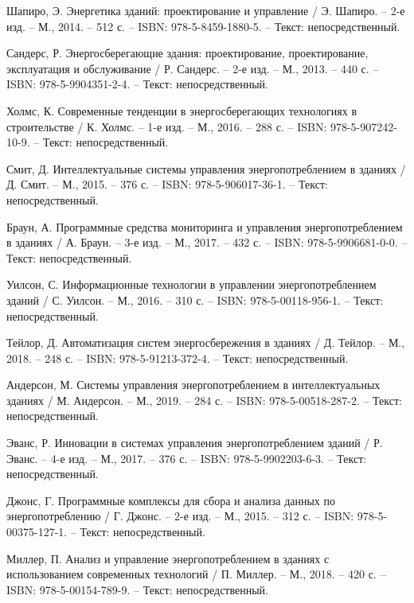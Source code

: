 
\begin{thebibliography}{50}
	
	 Шапиро, Э. Энергетика зданий: проектирование и управление / Э. Шапиро. – 2-е изд. – М., 2014. – 512 с. – ISBN: 978-5-8459-1880-5. – Текст: непосредственный.
	
	 Сандерс, Р. Энергосберегающие здания: проектирование, проектирование, эксплуатация и обслуживание / Р. Сандерс. – 2-е изд. – М., 2013. – 440 с. – ISBN: 978-5-9904351-2-4. – Текст: непосредственный.
	
	 Холмс, К. Современные тенденции в энергосберегающих технологиях в строительстве / К. Холмс. – 1-е изд. – М., 2016. – 288 с. – ISBN: 978-5-907242-10-9. – Текст: непосредственный.
	
	 Смит, Д. Интеллектуальные системы управления энергопотреблением в зданиях / Д. Смит. – М., 2015. – 376 с. – ISBN: 978-5-906017-36-1. – Текст: непосредственный.
	
	 Браун, А. Программные средства мониторинга и управления энергопотреблением в зданиях / А. Браун. – 3-е изд. – М., 2017. – 432 с. – ISBN: 978-5-9906681-0-0. – Текст: непосредственный.
	
	 Уилсон, С. Информационные технологии в управлении энергопотреблением зданий / С. Уилсон. – М., 2016. – 310 с. – ISBN: 978-5-00118-956-1. – Текст: непосредственный.
	
	 Тейлор, Д. Автоматизация систем энергосбережения в зданиях / Д. Тейлор. – М., 2018. – 248 с. – ISBN: 978-5-91213-372-4. – Текст: непосредственный.
	
	 Андерсон, М. Системы управления энергопотреблением в интеллектуальных зданиях / М. Андерсон. – М., 2019. – 284 с. – ISBN: 978-5-00518-287-2. – Текст: непосредственный.
	
	 Эванс, Р. Инновации в системах управления энергопотреблением зданий / Р. Эванс. – 4-е изд. – М., 2017. – 376 с. – ISBN: 978-5-9902203-6-3. – Текст: непосредственный.
	
	 Джонс, Г. Программные комплексы для сбора и анализа данных по энергопотреблению / Г. Джонс. – 2-е изд. – М., 2015. – 312 с. – ISBN: 978-5-00375-127-1. – Текст: непосредственный.
	
	 Миллер, П. Анализ и управление энергопотреблением в зданиях с использованием современных технологий / П. Миллер. – М., 2018. – 420 с. – ISBN: 978-5-00154-789-9. – Текст: непосредственный.
	

\end{thebibliography}
